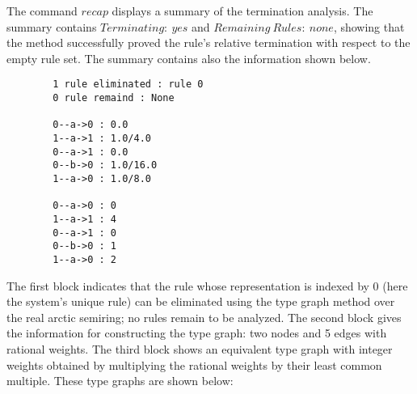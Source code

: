 The command \colorbox{Ivory2}{$recap$} displays a summary of the termination analysis. The summary contains \colorbox{Ivory2}{$Terminating:\ yes$} and \colorbox{Ivory2}{$Remaining\ Rules:\ none$}, showing that the method successfully proved the rule's relative termination with respect to the empty rule set.
The summary contains also the information shown below.
\begin{center}
    \begin{verbatim} 
        1 rule eliminated : rule 0 
        0 rule remaind : None

        0--a->0 : 0.0
        1--a->1 : 1.0/4.0 
        0--a->1 : 0.0
        0--b->0 : 1.0/16.0 
        1--a->0 : 1.0/8.0 

        0--a->0 : 0
        1--a->1 : 4
        0--a->1 : 0
        0--b->0 : 1
        1--a->0 : 2
    \end{verbatim}
\end{center}
The first block indicates that the rule whose representation is indexed by \colorbox{Ivory2}{0} (here the system's unique rule) can be eliminated using the type graph method over the real arctic semiring; no rules remain to be analyzed. The second block gives the information for constructing the type graph: two nodes and 5 edges with rational weights. The third block shows an equivalent type graph with integer weights obtained by multiplying the rational weights by their least common multiple. These type graphs are shown below:
